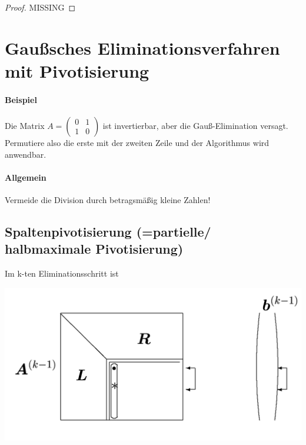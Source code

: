 \documentclass[ngerman,fontsize=11pt, paper=a4, parskip=half, titlepage=true, toc=bib]{scrbook}
\newcommand{\sectione}[1]{\section{#1} \setcounter{equation}{0}}
\begin{document}
\begin{proof}
MISSING

\end{proof}

\sectione{Gaußsches Eliminationsverfahren mit Pivotisierung}
\paragraph{Beispiel} Die Matrix $A= \begin{pmatrix}0&1\\1&0\end{pmatrix} $
ist invertierbar, aber die Gauß-Elimination versagt. Permutiere also die erste mit der
zweiten Zeile und der Algorithmus wird anwendbar.

\paragraph{Allgemein} Vermeide die Division durch betragsmäßig kleine Zahlen! 


\subsection{Spaltenpivotisierung (=partielle/ halbmaximale Pivotisierung)} 
Im k-ten  Eliminationsschritt ist\\
\parbox{\linewidth}{
	\centering
	\includegraphics[width=0.5\linewidth]{images/Gausspivot.png}
	\label{2.2.1.im1}
}
\end{document}
